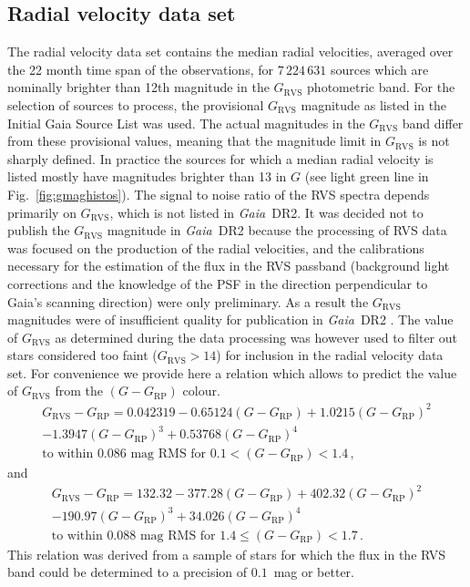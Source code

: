 \documentclass[longauth]{aa_gaia} %
\newcommand\gaia{\textit{Gaia}}
\newcommand\gdr[1]{\gaia~DR#1}
\newcommand\figref[1]{Fig.~\ref{#1}}
\newcommand\gdrtwovradnum{\ensuremath{7\,224\,631}}
\newcommand\grp{\ensuremath{G_\mathrm{RP}}}
\newcommand\grvs{\ensuremath{G_\mathrm{RVS}}}
\begin{document}
\subsection{Radial velocity data set}
\label{sec:rvsdata}

The radial velocity data set contains the median radial velocities, averaged over the 22 month time
span of the observations, for {\gdrtwovradnum} sources which are nominally brighter than 12th
magnitude in the {\grvs} photometric band. For the selection of sources to process, the provisional
{\grvs} magnitude as listed in the Initial Gaia Source List \citep{2014AA...570A..87S} was used.
The actual magnitudes in the {\grvs} band differ from these provisional values, meaning that the
magnitude limit in {\grvs} is not sharply defined. In practice the sources for which a median radial
velocity is listed mostly have magnitudes brighter than 13 in $G$ (see light green line in
\figref{fig:gmaghistos}). The signal to noise ratio of the RVS spectra depends primarily on {\grvs},
which is not listed in \gdr{2}. It was decided not to publish the {\grvs} magnitude in \gdr{2}
because the processing of RVS data was focused on the production of the radial velocities, and the
calibrations necessary for the estimation of the flux in the RVS passband (background light
corrections and the knowledge of the PSF in the direction perpendicular to Gaia's scanning
direction) were only preliminary. As a result the {\grvs} magnitudes were of insufficient quality
for publication in \gdr{2} \citep{DR2-DPACP-47}.  The value of {\grvs} as determined during the data
processing was however used to filter out stars considered too faint ($\grvs>14$) for inclusion in
the radial velocity data set. For convenience we provide here a relation which allows to predict the
value of {\grvs} from the $(G-\grp)$ colour.
%
\begin{multline}
  \grvs-\grp = 0.042319 - 0.65124(G-\grp) + 1.0215(G-\grp)^2\\
  -1.3947 (G-\grp)^3 + 0.53768(G-\grp)^4 \\
  \text{to within }0.086\text{ mag RMS for }0.1<(G-\grp)<1.4\,,
\end{multline}
and
\begin{multline}
  \grvs-\grp = 132.32 - 377.28(G-\grp) + 402.32(G-\grp)^2\\
  -190.97(G-\grp)^3 + 34.026(G-\grp)^4\\
  \text{to within }0.088\text{ mag RMS for }1.4\leq(G-\grp)<1.7\,.
  \label{eq:rvsfromgmingrp}
\end{multline}
%
This relation was derived from a sample of stars for which the flux in the RVS band could be
determined to a precision of $0.1$~mag or better.
\end{document}
